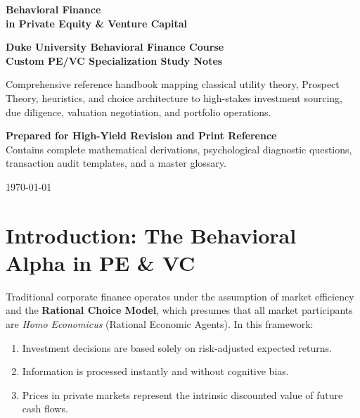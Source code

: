 \documentclass[11pt,a4paper]{article}
\begin{document}
\begin{titlepage}
    \centering
    \vspace*{2cm}
    {\huge\bfseries\color{navyblue} Behavioral Finance \\ in Private Equity \& Venture Capital \par}
    \vspace{1cm}
    {\Large\bfseries\color{emerald} Duke University Behavioral Finance Course \\ Custom PE/VC Specialization Study Notes \par}
    \vspace{2cm}
    {\large\normalfont\color{charcoal} Comprehensive reference handbook mapping classical utility theory, Prospect Theory, heuristics, and choice architecture to high-stakes investment sourcing, due diligence, valuation negotiation, and portfolio operations. \par}
    \vspace{3cm}
    \begin{tcolorbox}[colback=lightgrey, colframe=navyblue!40, arc=2mm, width=0.8\textwidth, halign=center]
        \textbf{Prepared for High-Yield Revision and Print Reference} \\
        Contains complete mathematical derivations, psychological diagnostic questions, transaction audit templates, and a master glossary.
    \end{tcolorbox}
    \vfill
    {\large \today \par}
\end{titlepage}

\newpage
\tableofcontents
\newpage

\section{Introduction: The Behavioral Alpha in PE \& VC}
Traditional corporate finance operates under the assumption of market efficiency and the \textbf{Rational Choice Model}, which presumes that all market participants are \textit{Homo Economicus} (Rational Economic Agents). In this framework:
\begin{enumerate}
    \item Investment decisions are based solely on risk-adjusted expected returns.
    \item Information is processed instantly and without cognitive bias.
    \item Prices in private markets represent the intrinsic discounted value of future cash flows.
\end{enumerate}
\end{document}
